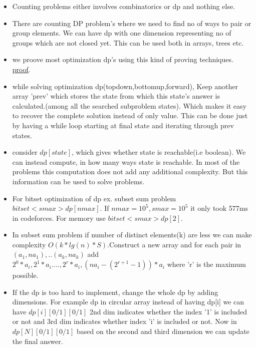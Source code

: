 \documentclass[../Notes.tex]{subfiles}
\begin{document}
\begin{itemize}
	\item Counting problems either involves combinatorics or dp and nothing else.
	\item There are counting DP problem's where we need to find no of ways to pair or group elements. We can have dp with one dimension representing no of groups which are not closed yet. This can be used both in arrays, trees etc.  
	\item we proove most optimization dp's using this kind of proving techniques.
	\href{Material/dpproof.pdf}{proof}.\pagebreak
	\item while solving optimization dp(topdown,bottomup,forward), Keep another array 'prev' which stores the state from which this state's answer is calculated.(among all the searched subproblem states). Which makes it easy to recover the complete solution instead of only value. This can be done just by having a while loop starting at final state and iterating through prev states.
	\item consider $dp[state]$, which gives whether state is reachable(i.e boolean). We can instead compute, in how many ways state is reachable. In most of the problems this computation does not add any additional complexity. But this information can be used to solve problems.   
	\item For bitset optimization of dp ex. subset sum problem $bitset<smax> dp[nmax]$. If $nmax = 10^5, smax = 10^5$ it only took 577ms in codeforces. For memory use $bitset<smax> dp[2]$. 
	\item In subset sum problem if number of distinct elements(k) are less we can make complexity $O(k*lg(n)*S)$.Construct a new array and for each pair in $(a_1,na_1),..(a_k,na_k)$ add $2^0*a_i, 2^1*a_i...., 2^r*a_i, (na_i-(2^{r+1}-1))*a_i$ where 'r' is the maximum possible.
	\item If the dp is too hard to implement, change the whole dp by adding dimensions. For example dp in circular array instead of having dp[i] we can have $dp[i][0/1][0/1]$ 2nd dim indicates whether the index '1' is included or not and 3rd dim indicates whether index 'i' is included or not. Now in $dp[N][0/1][0/1]$ based on the second and third dimension we can update the final answer.
\end{itemize}
\end{document}
